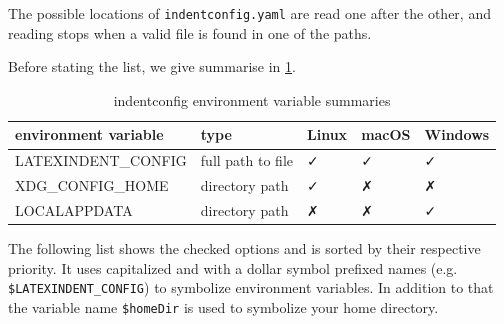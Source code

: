 \documentclass[10pt]{article}
\begin{document}
  The possible locations of \texttt{indentconfig.yaml} are read one after the other, and
  reading stops when a valid file is found in one of the paths.

  Before stating the list, we give summarise in \cref{tab:environment:summary}.
  \begin{table}[!htb]
   \centering
   \caption{indentconfig environment variable summaries}
   \label{tab:environment:summary}
   \begin{tabular}{lllll}
    \toprule
    environment variable & type              & Linux    & macOS    & Windows  \\
    \midrule
    LATEXINDENT\_CONFIG  & full path to file & \faCheck & \faCheck & \faCheck \\
    XDG\_CONFIG\_HOME    & directory path    & \faCheck & \faClose & \faClose \\
    LOCALAPPDATA         & directory path    & \faClose & \faClose & \faCheck \\
    \bottomrule
   \end{tabular}
  \end{table}

  The following list shows the checked options and is sorted by their respective
  priority. It uses capitalized and with a dollar symbol prefixed names (e.g.
  \texttt{\$LATEXINDENT\_CONFIG}) to symbolize environment variables. In addition to that
  the variable name \texttt{\$homeDir} is used to symbolize your home directory.
\end{document}
